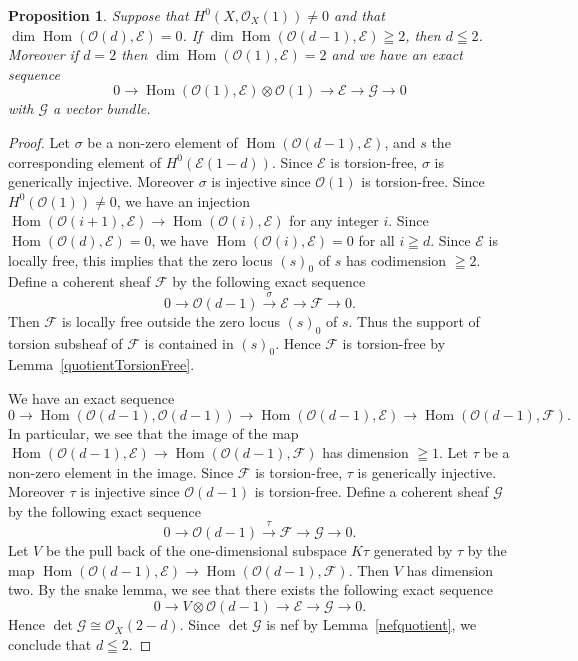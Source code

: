 \documentclass[a4paper,12pt]{amsart}
\newtheorem{prop}[thm]{Proposition}%
\DeclareMathOperator{\Hom}{Hom}
\begin{document}
\begin{prop}\label{generalO(1)double}
Suppose that 
$H^0(X,\mathcal{O}_X(1))\neq 0$
and 
that $\dim \Hom(\mathcal{O}(d), \mathcal{E})=0$.
If $\dim \Hom(\mathcal{O}(d-1),\mathcal{E})\geqq 2$,
then $d\leqq 2$.
Moreover if $d=2$ then $\dim \Hom(\mathcal{O}(1),\mathcal{E})= 2$
and 
we have an exact sequence 
\[0\to 
\Hom(\mathcal{O}(1),\mathcal{E})
\otimes \mathcal{O}(1)\to \mathcal{E}\to \mathcal{G}\to 0\]
with $\mathcal{G}$ a 
vector bundle.
\end{prop}
\begin{proof}
Let $\sigma$ be a non-zero element of $\Hom(\mathcal{O}(d-1),\mathcal{E})$,
and $s$ the corresponding element of $H^0(\mathcal{E}(1-d))$.
Since $\mathcal{E}$ is torsion-free, $\sigma$ is generically injective.
Moreover $\sigma$ is injective since $\mathcal{O}(1)$ is torsion-free.
Since $H^0(\mathcal{O}(1))\neq 0$,
we have an injection 
$\Hom(\mathcal{O}(i+1),\mathcal{E})\to 
\Hom(\mathcal{O}(i),\mathcal{E})$ for any integer $i$.
Since $\Hom(\mathcal{O}(d), \mathcal{E})=0$,
we have $\Hom(\mathcal{O}(i), \mathcal{E})=0$ for all $i\geqq d$.
Since $\mathcal{E}$ is locally free,
this implies that the zero locus $(s)_0$ of $s$ has codimension $\geqq 2$.
Define a coherent sheaf $\mathcal{F}$ by the following exact sequence
\[0\to \mathcal{O}(d-1)\xrightarrow{\sigma} \mathcal{E}\to \mathcal{F}\to 0.\]
Then $\mathcal{F}$ is locally free outside the zero locus $(s)_0$ of $s$.
Thus the support of torsion subsheaf of $\mathcal{F}$ is contained in $(s)_0$.
Hence $\mathcal{F}$ is torsion-free by Lemma~\ref{quotientTorsionFree}.


We have an exact sequence
\[0\to \Hom(\mathcal{O}(d-1),\mathcal{O}(d-1))\to \Hom(\mathcal{O}(d-1),\mathcal{E})\to \Hom(\mathcal{O}(d-1),\mathcal{F}).
\]
In particular, 
we see that the image of the map $\Hom(\mathcal{O}(d-1),\mathcal{E})\to\Hom(\mathcal{O}(d-1), \mathcal{F})$
has dimension $\geqq 1$.
Let $\tau$ be a non-zero element 
in the image.
Since $\mathcal{F}$ is torsion-free, $\tau$ is generically injective.
Moreover $\tau$ is injective since $\mathcal{O}(d-1)$ is torsion-free.
Define a coherent sheaf $\mathcal{G}$ by the following exact sequence
\[0\to \mathcal{O}(d-1)\xrightarrow{\tau} \mathcal{F}\to \mathcal{G}\to 0.\]
Let $V$ be the pull back of the one-dimensional subspace $K\tau$ generated by $\tau$
by the map $\Hom(\mathcal{O}(d-1),\mathcal{E})\to \Hom(\mathcal{O}(d-1),\mathcal{F})$.
Then $V$ has dimension two. 
By the snake lemma, we see that there exists the following exact sequence
\[0\to V\otimes \mathcal{O}(d-1)\to \mathcal{E}\to \mathcal{G}\to 0.\]
Hence $\det\mathcal{G}\cong \mathcal{O}_X(2-d)$.
Since $\det\mathcal{G}$ is nef by Lemma~\ref{nefquotient},
we conclude that $d\leqq 2$.


\end{proof}
\end{document}
